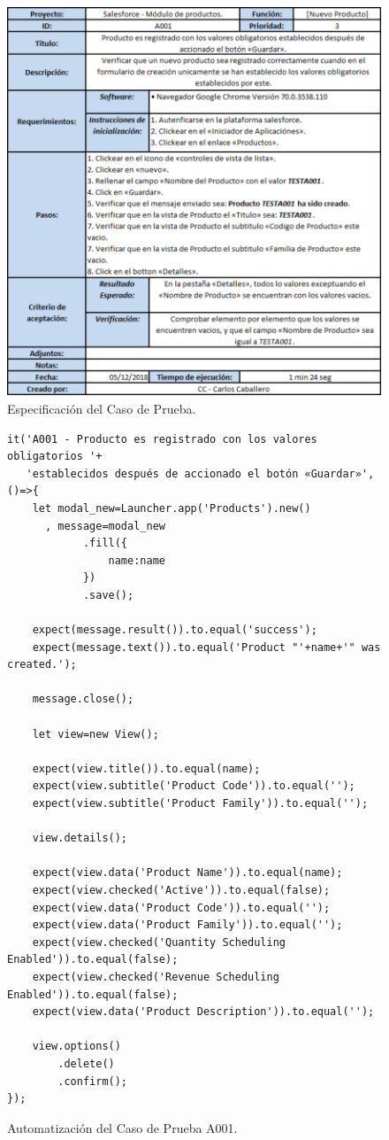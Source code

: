 \begin{figure}
\centering
\includegraphics[width=1.0\textwidth]{graphics/lltc.eps}
\caption{Especificación del Caso de Prueba.}
\label{lltc}
\end{figure}

\begin{figure}
\begin{verbatim}
it('A001 - Producto es registrado con los valores obligatorios '+
   'establecidos después de accionado el botón «Guardar»',()=>{
    let modal_new=Launcher.app('Products').new()
      , message=modal_new
            .fill({
                name:name
            })
            .save();

    expect(message.result()).to.equal('success');
    expect(message.text()).to.equal('Product "'+name+'" was created.');

    message.close();

    let view=new View();

    expect(view.title()).to.equal(name);
    expect(view.subtitle('Product Code')).to.equal('');
    expect(view.subtitle('Product Family')).to.equal('');

    view.details();

    expect(view.data('Product Name')).to.equal(name);
    expect(view.checked('Active')).to.equal(false);
    expect(view.data('Product Code')).to.equal('');
    expect(view.data('Product Family')).to.equal('');
    expect(view.checked('Quantity Scheduling Enabled')).to.equal(false);
    expect(view.checked('Revenue Scheduling Enabled')).to.equal(false);
    expect(view.data('Product Description')).to.equal('');

    view.options()
        .delete()
        .confirm();
});
\end{verbatim}
\caption{Automatización del Caso de Prueba A001.}
\label{spec}
\end{figure}

